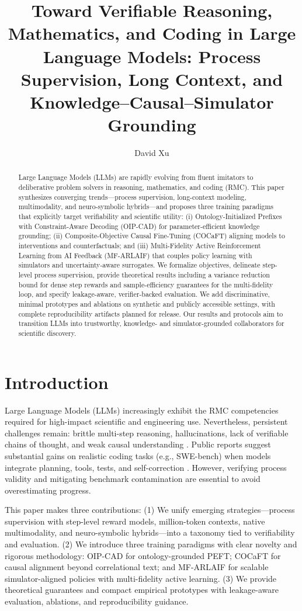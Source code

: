 \documentclass{article}
\title{Toward Verifiable Reasoning, Mathematics, and Coding in Large Language Models: Process Supervision, Long Context, and Knowledge--Causal--Simulator Grounding}
\author[1]{David Xu}
\affil[1]{China Mobile Research Institute}
\date{}
\begin{document}
\maketitle

\begin{abstract}
Large Language Models (LLMs) are rapidly evolving from fluent imitators to deliberative problem solvers in reasoning, mathematics, and coding (RMC). This paper synthesizes converging trends—process supervision, long-context modeling, multimodality, and neuro-symbolic hybrids—and proposes three training paradigms that explicitly target verifiability and scientific utility: (i) Ontology-Initialized Prefixes with Constraint-Aware Decoding (OIP-CAD) for parameter-efficient knowledge grounding; (ii) Composite-Objective Causal Fine-Tuning (COCaFT) aligning models to interventions and counterfactuals; and (iii) Multi-Fidelity Active Reinforcement Learning from AI Feedback (MF-ARLAIF) that couples policy learning with simulators and uncertainty-aware surrogates. We formalize objectives, delineate step-level process supervision, provide theoretical results including a variance reduction bound for dense step rewards and sample-efficiency guarantees for the multi-fidelity loop, and specify leakage-aware, verifier-backed evaluation. We add discriminative, minimal prototypes and ablations on synthetic and publicly accessible settings, with complete reproducibility artifacts planned for release. Our results and protocols aim to transition LLMs into trustworthy, knowledge- and simulator-grounded collaborators for scientific discovery.
\end{abstract}

\section{Introduction}
Large Language Models (LLMs) increasingly exhibit the RMC competencies required for high-impact scientific and engineering use. Nevertheless, persistent challenges remain: brittle multi-step reasoning, hallucinations, lack of verifiable chains of thought, and weak causal understanding \cite{bubeck2023sparks, mondorf2024beyond}. Public reports suggest substantial gains on realistic coding tasks (e.g., SWE-bench) when models integrate planning, tools, tests, and self-correction \cite{swebench}. However, verifying process validity and mitigating benchmark contamination are essential to avoid overestimating progress.

This paper makes three contributions:
(1) We unify emerging strategies—process supervision with step-level reward models, million-token contexts, native multimodality, and neuro-symbolic hybrids—into a taxonomy tied to verifiability and evaluation.
(2) We introduce three training paradigms with clear novelty and rigorous methodology: OIP-CAD for ontology-grounded PEFT; COCaFT for causal alignment beyond correlational text; and MF-ARLAIF for scalable simulator-aligned policies with multi-fidelity active learning.
(3) We provide theoretical guarantees and compact empirical prototypes with leakage-aware evaluation, ablations, and reproducibility guidance.
\end{document}
